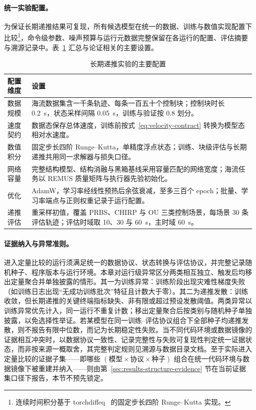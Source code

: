 \paragraph{统一实验配置。}为保证长期递推结果可复现，所有候选模型在统一的数据、训练与数值实现配置下比较\footnote{连续时间积分基于 torchdiffeq~\citep{chen2018neuralode} 的固定步长四阶 Runge--Kutta 实现。}，命令级参数、噪声预算与运行元数据完整保留在各运行的配置、评估摘要与溯源记录中。表~\ref{tab:experimental-config} 汇总与论证相关的主要设置。

\begin{table}[htbp]
  \centering
  \caption{长期递推实验的主要配置}
  \label{tab:experimental-config}
  \begin{tabularx}{\textwidth}{>{\raggedright\arraybackslash}p{}>{\raggedright\arraybackslash}X}
    \toprule
    配置维度 & 设置 \\
    \midrule
    数据规模 & 海流数据集含一千条轨迹、每条一百五十个控制块；控制块时长 0.2~s，状态采样间隔 0.05~s，训练与验证按 \(0.8\) 划分。 \\
    速度契约 & 数据态保存总体速度，训练前按式~\eqref{eq:velocity-contract} 转换为模型态相对水速度。 \\
    数值积分 & 固定步长四阶 Runge--Kutta，单精度浮点状态；训练、块级评估与长期递推共用同一求解器与损失口径。 \\
    网络容量 & 完整结构模型、结构消融与黑箱基线采用容量匹配的网络宽度；海流任务以 REMUS 质量矩阵与执行器先验初始化。 \\
    优化 & AdamW，学习率经线性预热后余弦衰减，至多三百个 epoch；批量、学习率端点与正则权重记录于运行配置。 \\
    递推评估 & 重采样初值，覆盖 PRBS、CHIRP 与 OU 三类控制场景，每场景 30 条评估轨迹；评估时域取 10、30 与 60~s，主时域 60~s。 \\
    \bottomrule
  \end{tabularx}
\end{table}

\paragraph{证据纳入与异常准则。}进入定量比较的运行须满足统一的数据协议、状态转换与评估协议，并完整记录随机种子、程序版本与运行环境。本章对运行级异常区分两类相互独立、触发后均移出定量聚合并单独披露的情形。其一为训练异常：训练阶段出现灾难性梯度失败（如训练日志出现“无成功训练批次”特征且计数大于零）。其二为递推发散：训练收敛，但长期递推的关键终端指标缺失、非有限或超过预设发散阈值。两类异常以训练异常优先计入，同一运行不重复计数；移出定量聚合后按类别与随机种子单独披露，以免选择性举证。若某模型在同一训练--评估协议组合下全部种子均递推发散，则不报告有限中位数，而记为长期稳定性失败。当不同代码环境或数据镜像的证据相互冲突时，以数据协议一致性、记录完整性与失败可复现性判定统一证据状态，而非按来源一概取舍，其完整判定规则见溯源与数据目录文档。至于实际进入定量比较的证据子集——即哪些 \((\text{模型}\times\text{协议}\times\text{种子})\) 组合在统一代码环境与数据镜像下被重建并纳入——则由第~\ref{sec:results-structure-evidence} 节在当前证据集口径下报告，本节不预先锁定。
